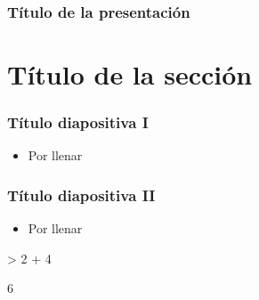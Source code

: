 



\usepackage{Sweave}



\begin{frame}[allowframebreaks]
  \titlepage
\end{frame}

\begin{frame}[allowframebreaks]
  \frametitle{Título de la presentación}
  \tableofcontents
\end{frame}

\section{Título de la sección}

\begin{frame}[allowframebreaks]
  \frametitle{Título diapositiva I}
  \begin{itemize}
    \item \textquestiondown Por llenar
  \end{itemize}
\end{frame}

\begin{frame}
  \frametitle{Título diapositiva II}
  \begin{itemize}
    \item Por llenar
  \end{itemize}
\begin{Schunk}
\begin{Sinput}
> 2 + 4
\end{Sinput}
\begin{Soutput}
[1] 6
\end{Soutput}
\end{Schunk}

\end{frame}
 



